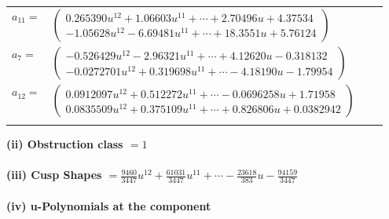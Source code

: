 \documentclass[1p]{elsarticle_modified}
\theoremstyle{definition}
\begin{document}
\begin{tabular}{m{7pt} m{180pt} m{7pt} m{180pt} }
\flushright $a_{11}=$&$\begin{pmatrix}0.265390 u^{12}+1.06603 u^{11}+\cdots+2.70496 u+4.37534\\-1.05628 u^{12}-6.69481 u^{11}+\cdots+18.3551 u+5.76124\end{pmatrix}$ \\
\flushright $a_{7}=$&$\begin{pmatrix}-0.526429 u^{12}-2.96321 u^{11}+\cdots+4.12620 u-0.318132\\-0.0272701 u^{12}+0.319698 u^{11}+\cdots-4.18190 u-1.79954\end{pmatrix}$ \\
\flushright $a_{12}=$&$\begin{pmatrix}0.0912097 u^{12}+0.512272 u^{11}+\cdots-0.0696258 u+1.71958\\0.0835509 u^{12}+0.375109 u^{11}+\cdots+0.826806 u+0.0382942\end{pmatrix}$\\&\end{tabular}
\flushleft \textbf{(ii) Obstruction class $= 1$}\\~\\
\flushleft \textbf{(iii) Cusp Shapes $= \frac{9460}{3447} u^{12}+\frac{61031}{3447} u^{11}+\cdots-\frac{23618}{383} u-\frac{94159}{3447}$}\\~\\
\newpage\renewcommand{\arraystretch}{1}
\flushleft \textbf{(iv) u-Polynomials at the component}\newline \\
\end{document}
